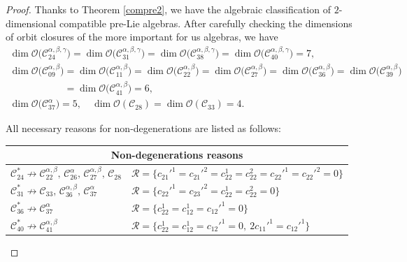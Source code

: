 \documentclass[10pt,a4paper]{amsart}
\numberwithin{equation}{section}
\begin{document}
\begin{proof}
 Thanks to Theorem \ref{compre2}, we have the algebraic classification of
 $2$-dimensional compatible pre-Lie algebras.
After carefully checking the dimensions of orbit closures of the more important for us algebras, we have
\begin{gather*}
 \dim \mathcal{O}\bigl(\mathcal{C}_{24}^{\alpha,\beta,\gamma}\bigr)=\dim \mathcal{O}\bigl(\mathcal{C}_{31}^{\alpha,\beta,\gamma}\bigr)=\dim \mathcal{O}\bigl(\mathcal{C}_{38}^{\alpha,\beta,\gamma}\bigr)=\dim \mathcal{O}\bigl(\mathcal{C}_{40}^{\alpha,\beta,\gamma}\bigr) = 7 , \\
\dim \mathcal{O}\bigl(\mathcal{C}_{09}^{\alpha,\beta}\bigr)=
\dim \mathcal{O}\bigl(\mathcal{C}_{11}^{\alpha,\beta}\bigr)=
\dim \mathcal{O}\bigl(\mathcal{C}_{22}^{\alpha,\beta}\bigr)=
\dim \mathcal{O}\bigl(\mathcal{C}_{27}^{\alpha,\beta}\bigr) =
 \dim \mathcal{O}\bigl(\mathcal{C}_{36}^{\alpha,\beta}\bigr)=
\dim \mathcal{O}\bigl(\mathcal{C}_{39}^{\alpha,\beta}\bigr) \\
\phantom{\dim \mathcal{O}\bigl(\mathcal{C}_{09}^{\alpha,\beta}\bigr)}{}=\dim \mathcal{O}\bigl(\mathcal{C}_{41}^{\alpha,\beta}\bigr) = 6 , \\
 \dim \mathcal{O}\bigl(\mathcal{C}_{37}^\alpha\bigr) = 5, \quad
 \dim \mathcal{O}(\mathcal{C}_{28})=\dim \mathcal{O}(\mathcal{C}_{33}) = 4.
\end{gather*}


All necessary reasons for non-degenerations are listed as follows:
\begin{center}\renewcommand{\arraystretch}{1.3}
\begin{tabular}{l|l}
\hline
 \multicolumn{2}{c}{Non-degenerations reasons} \\
\hline
$\mathcal{C}_{24}^{*}
\not \rightarrow
\mathcal{C}_{22}^{\alpha,\beta}, \,
\mathcal{C}_{26}^{\alpha}, \,
\mathcal{C}_{27}^{\alpha,\beta}, \,
\mathcal{C}_{28}$
&
$\mathcal R=\bigl\{c_{21}'^1=c_{21}'^2=c_{22}^1=c_{22}^2=c_{22}'^1=c_{22}'^2=0\bigr\}$\\
\hline
$
\mathcal{C}_{31}^{*}
\not \rightarrow
\mathcal{C}_{33}, \,
\mathcal{C}_{36}^{\alpha,\beta}, \,
\mathcal{C}_{37}^{\alpha}$
&
$\mathcal R=\bigl\{
c_{22}'^1=c_{23}'^2=c_{22}^1=c_{22}^2=0
\bigr\}
$\\
\hline
$\mathcal{C}_{36}^{*}
\not \rightarrow \mathcal{C}_{37}^{\alpha}$
&
$\mathcal R=\bigl\{
c_{22}^1=c_{12}^1=c_{12}'^1=0\bigr\}
$\\
\hline
$\mathcal{C}_{40}^{*}\not \rightarrow\mathcal{C}_{41}^{\alpha,\beta}$
&
$\mathcal R=\bigl\{
c_{22}^1=c_{12}^1=c_{12}'^1=0, \ 2 c_{11}'^1=c_{12}'^1
\bigr\}$\\
\hline
\end{tabular}
\end{center}


\end{proof}
\end{document}
